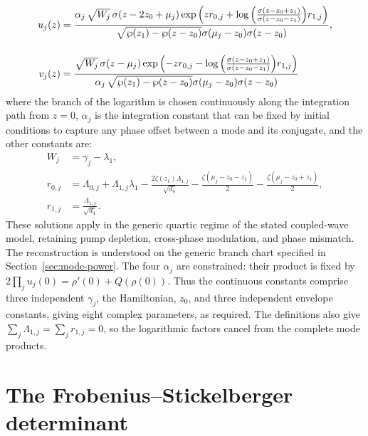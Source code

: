 \documentclass[11pt,a4paper]{article}
\numberwithin{equation}{section}
\begin{document}
\begin{align}
u_j{\left(z\right)} &= \frac{\alpha_j\,\sqrt{W_j} \,\sigma{\left(z - 2 z_{0} + {\mu}_{j} \right)} \exp\left(z {r}_{0,j} + \log{\left(\frac{\sigma{\left(z - z_{0} + z_{1} \right)}}{\sigma{\left(z - z_{0} - z_{1} \right)}} \right)} {r}_{1,j}\right)}{\sqrt{\wp{\left(z_{1} \right)} - \wp{\left(z - z_{0} \right)}} \sigma{\left({\mu}_{j} - z_{0}\right)} \sigma{\left(z - z_{0} \right)}}, \notag \\[12pt]
v_j{\left(z\right)} &= \frac{\sqrt{W_j} \, \sigma{\left(z - {\mu}_{j} \right)} \exp\left(- z {r}_{0,j} - \log{\left(\frac{\sigma{\left(z - z_{0} + z_{1} \right)}}{\sigma{\left(z - z_{0} - z_{1} \right)}} \right)} {r}_{1,j} \right)}{\alpha_j\,\sqrt{\wp{\left(z_{1} \right)} - \wp{\left(z - z_{0} \right)}} \sigma{\left({\mu}_{j} - z_{0}\right)} \sigma{\left(z - z_{0} \right)}} \label{eq:u-v-quartic}
\end{align}
where the branch of the logarithm is chosen continuously along the integration path from $z=0$, $\alpha_j$ is the integration constant that can be fixed by initial conditions to capture any phase offset between a mode and its conjugate, and the other constants are:
\begin{align}
W_j &= \gamma_j-\lambda_1, \\[6pt]
r_{0,j} &= {\Lambda}_{0,j} + {\Lambda}_{1,j} {\lambda}_{1} - \frac{2 \zeta{\left(z_{1} \right)} {\Lambda}_{1,j}}{\sqrt{{d}_{4}}} - \frac{\zeta{\left({\mu}_{j} - z_{0} - z_{1}\right)}}{2} - \frac{\zeta{\left({\mu}_{j} - z_{0} + z_{1}\right)}}{2}, \\[6pt]
r_{1,j} &= \frac{{\Lambda}_{1,j}}{\sqrt{{d}_{4}}}.
\end{align}
These solutions apply in the generic quartic regime of the stated coupled-wave model, retaining pump depletion, cross-phase modulation, and phase mismatch.
The reconstruction is understood on the generic branch chart specified in Section~\ref{sec:mode-power}.
The four $\alpha_j$ are constrained: their product is fixed by $2\prod_j u_j(0)=\rho'(0)+Q(\rho(0))$.
Thus the continuous constants comprise three independent $\gamma_j$, the Hamiltonian, $z_0$, and three independent envelope constants, giving eight complex parameters, as required.
The definitions also give $\sum_j\Lambda_{1,j}=\sum_jr_{1,j}=0$, so the logarithmic factors cancel from the complete mode products.



\section{The Frobenius--Stickelberger determinant}
\label{sec:fs-det-ham-proof}
\end{document}
